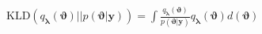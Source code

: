 \documentclass[preview]{standalone}
\begin{document}
\begin{center}
$\mathrm{KLD} (q_{\boldsymbol{\lambda}}(\boldsymbol{\vartheta}) || p(\boldsymbol{\vartheta}| \boldsymbol{y})) = 
    \int \frac{q_{\boldsymbol{\lambda}}(\boldsymbol{\vartheta})}{p(\boldsymbol{\vartheta} | \boldsymbol{y})}
    q_{\boldsymbol{\lambda}}(\boldsymbol{\vartheta})d(\boldsymbol{\vartheta})$
\end{center}
\end{document}
